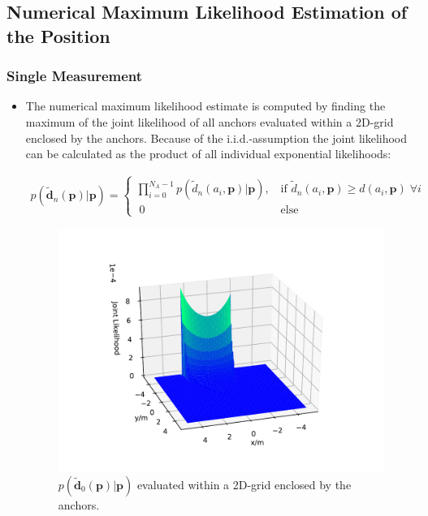 \documentclass{article}
\begin{document}
\subsection{Numerical Maximum Likelihood Estimation of the Position}
\subsubsection{Single Measurement}

\begin{itemize}
\item The numerical maximum likelihood estimate is computed by finding the maximum of the joint likelihood of all anchors evaluated within a 2D-grid enclosed by the anchors. Because of the i.i.d.-assumption the joint likelihood can be calculated as the product of all individual exponential likelihoods:

\begin{align*}
p(\mathbf{\tilde{d}}_n(\mathbf{p})|\mathbf{p}) = 
\begin{cases}
\displaystyle \prod_{i=0}^{N_A-1} p(\tilde{d}_n(a_i,\mathbf{p})|\mathbf{p})\text{,}	& 	\; \text{if } \tilde{d}_n(a_i,\mathbf{p}) \geq d (a_i,\mathbf{p}) \; \forall i \\
\; 0 	&	\; \text{else}
\end{cases}
\end{align*} 

\begin{figure}[h]
\centering
\includegraphics[width=\textwidth]{./Figures/scenario3_grid_nml.pdf}
\caption{$p(\mathbf{\tilde{d}}_0(\mathbf{p})|\mathbf{p})$ evaluated within a 2D-grid enclosed by the anchors.}
\label{fig:scenario3_grid_nml}
\end{figure}


\end{itemize}
\end{document}

